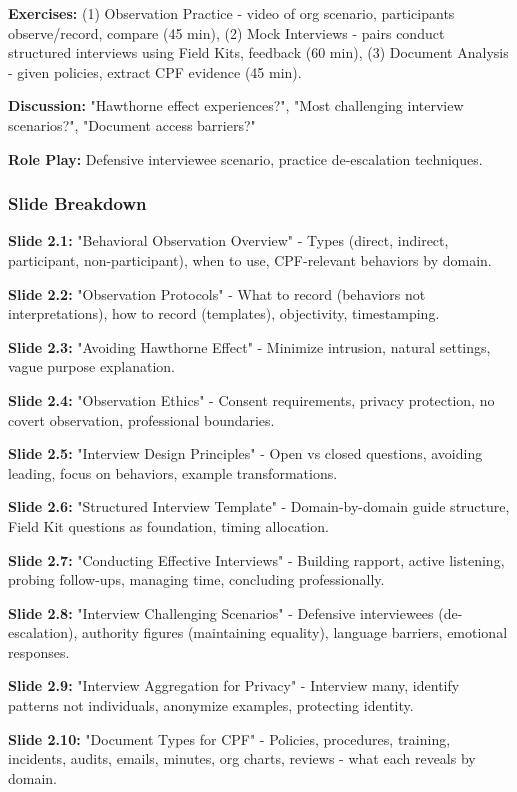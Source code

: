 \documentclass[11pt,a4paper]{article}
\begin{document}
\textbf{Exercises:} (1) Observation Practice - video of org scenario, participants observe/record, compare (45 min), (2) Mock Interviews - pairs conduct structured interviews using Field Kits, feedback (60 min), (3) Document Analysis - given policies, extract CPF evidence (45 min).

\textbf{Discussion:} "Hawthorne effect experiences?", "Most challenging interview scenarios?", "Document access barriers?"

\textbf{Role Play:} Defensive interviewee scenario, practice de-escalation techniques.

\subsubsection{Slide Breakdown}

\textbf{Slide 2.1:} "Behavioral Observation Overview" - Types (direct, indirect, participant, non-participant), when to use, CPF-relevant behaviors by domain.

\textbf{Slide 2.2:} "Observation Protocols" - What to record (behaviors not interpretations), how to record (templates), objectivity, timestamping.

\textbf{Slide 2.3:} "Avoiding Hawthorne Effect" - Minimize intrusion, natural settings, vague purpose explanation.

\textbf{Slide 2.4:} "Observation Ethics" - Consent requirements, privacy protection, no covert observation, professional boundaries.

\textbf{Slide 2.5:} "Interview Design Principles" - Open vs closed questions, avoiding leading, focus on behaviors, example transformations.

\textbf{Slide 2.6:} "Structured Interview Template" - Domain-by-domain guide structure, Field Kit questions as foundation, timing allocation.

\textbf{Slide 2.7:} "Conducting Effective Interviews" - Building rapport, active listening, probing follow-ups, managing time, concluding professionally.

\textbf{Slide 2.8:} "Interview Challenging Scenarios" - Defensive interviewees (de-escalation), authority figures (maintaining equality), language barriers, emotional responses.

\textbf{Slide 2.9:} "Interview Aggregation for Privacy" - Interview many, identify patterns not individuals, anonymize examples, protecting identity.

\textbf{Slide 2.10:} "Document Types for CPF" - Policies, procedures, training, incidents, audits, emails, minutes, org charts, reviews - what each reveals by domain.
\end{document}
